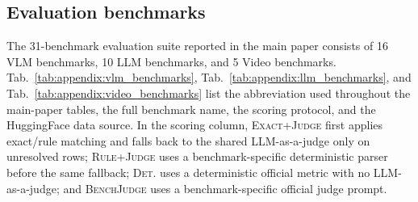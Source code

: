\subsection{Evaluation benchmarks}
\label{sec:appendix:benchmarks}

The 31-benchmark evaluation suite reported in the main paper consists of 16 VLM benchmarks, 10 LLM benchmarks, and 5 Video benchmarks. Tab.~\ref{tab:appendix:vlm_benchmarks}, Tab.~\ref{tab:appendix:llm_benchmarks}, and Tab.~\ref{tab:appendix:video_benchmarks} list the abbreviation used throughout the main-paper tables, the full benchmark name, the scoring protocol, and the HuggingFace data source. In the scoring column, \textsc{Exact+Judge} first applies exact/rule matching and falls back to the shared LLM-as-a-judge only on unresolved rows; \textsc{Rule+Judge} uses a benchmark-specific deterministic parser before the same fallback; \textsc{Det.} uses a deterministic official metric with no LLM-as-a-judge; and \textsc{BenchJudge} uses a benchmark-specific official judge prompt.

